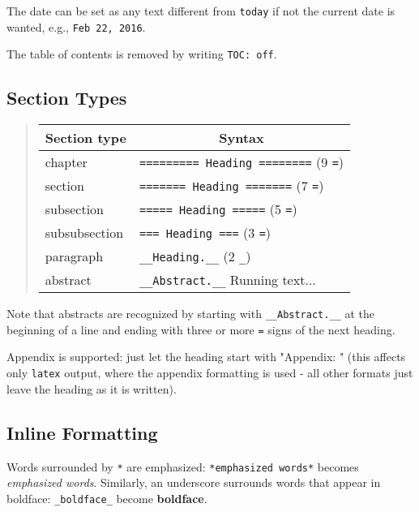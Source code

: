 \documentclass[%
oneside,                 %
final,                   %
10pt]{article}
\begin{document}
The date can be set as any text different from \Verb!today! if not the
current date is wanted, e.g., \Verb!Feb 22, 2016!.

The table of contents is removed by writing \Verb!TOC: off!.

\subsection{Section Types}

\label{quick:sections}


\begin{quote}\begin{tabular}{ll}
\hline
\multicolumn{1}{c}{ Section type } & \multicolumn{1}{c}{ Syntax } \\
\hline
chapter                                        & \Verb!========= Heading ========! (9 \Verb!=!) \\
section                                        & \Verb!======= Heading =======!    (7 \Verb!=!) \\
subsection                                     & \Verb!===== Heading =====!        (5 \Verb!=!) \\
subsubsection                                  & \Verb!=== Heading ===!            (3 \Verb!=!) \\
paragraph                                      & \Verb!__Heading.__!               (2 \Verb!_!) \\
abstract                                       & \Verb!__Abstract.__! Running text...           \\
\hline
\end{tabular}\end{quote}

\noindent
Note that abstracts are recognized by starting with \Verb!__Abstract.__! at
the beginning of a line and ending with three or more \Verb!=! signs of the
next heading.

Appendix is supported: just let the heading start with "Appendix: "
(this affects only \Verb!latex! output, where the appendix formatting
is used - all other formats just leave the heading as it is written).

\subsection{Inline Formatting}

Words surrounded by \Verb!*! are emphasized: \Verb!*emphasized words*! becomes
\emph{emphasized words}. Similarly, an underscore surrounds words that
appear in boldface: \Verb!_boldface_! become \textbf{boldface}.
\end{document}
